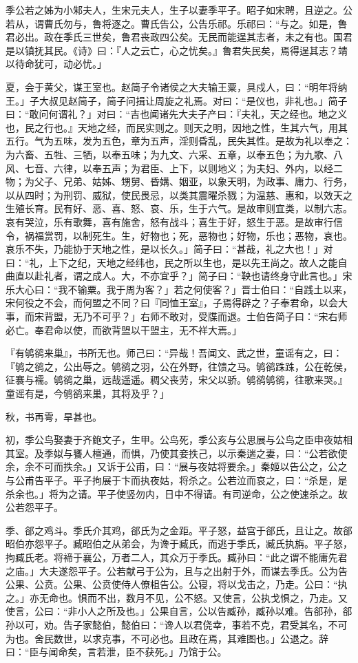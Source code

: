\documentclass[]{article}
\begin{document}
季公若之姊为小邾夫人，生宋元夫人，生子以妻季平子。昭子如宋聘，且逆之。公若从，谓曹氏勿与，鲁将逐之。曹氏告公，公告乐祁。乐祁曰：``与之。如是，鲁君必出。政在季氏三世矣，鲁君丧政四公矣。无民而能逞其志者，未之有也。国君是以镇抚其民。《诗》曰：『人之云亡，心之忧矣。』鲁君失民矣，焉得逞其志？靖以待命犹可，动必忧。」

夏，会于黄父，谋王室也。赵简子令诸侯之大夫输王粟，具戍人，曰：``明年将纳王。」子大叔见赵简子，简子问揖让周旋之礼焉。对曰：``是仪也，非礼也。」简子曰：``敢问何谓礼？」对曰：``吉也闻诸先大夫子产曰：『夫礼，天之经也。地之义也，民之行也。』天地之经，而民实则之。则天之明，因地之性，生其六气，用其五行。气为五味，发为五色，章为五声，淫则昏乱，民失其性。是故为礼以奉之：为六畜、五牲、三牺，以奉五味；为九文、六采、五章，以奉五色；为九歌、八风、七音、六律，以奉五声；为君臣、上下，以则地义；为夫妇、外内，以经二物；为父子、兄弟、姑姊、甥舅、昏媾、姻亚，以象天明，为政事、庸力、行务，以从四时；为刑罚、威狱，使民畏忌，以类其震曜杀戮；为温慈、惠和，以效天之生殖长育。民有好、恶、喜、怒、哀、乐，生于六气。是故审则宜类，以制六志。哀有哭泣，乐有歌舞，喜有施舍，怒有战斗；喜生于好，怒生于恶。是故审行信令，祸福赏罚，以制死生。生，好物也；死，恶物也；好物，乐也；恶物，哀也。哀乐不失，乃能协于天地之性，是以长久。」简子曰：``甚哉，礼之大也！」对曰：``礼，上下之纪，天地之经纬也，民之所以生也，是以先王尚之。故人之能自曲直以赴礼者，谓之成人。大，不亦宜乎？」简子曰：``鞅也请终身守此言也。」宋乐大心曰：``我不输粟。我于周为客？」若之何使客？」晋士伯曰：``自践土以来，宋何役之不会，而何盟之不同？曰『同恤王室』，子焉得辟之？子奉君命，以会大事，而宋背盟，无乃不可乎？」右师不敢对，受牒而退。士伯告简子曰：``宋右师必亡。奉君命以使，而欲背盟以干盟主，无不祥大焉。」

『有鸲鹆来巢』，书所无也。师己曰：``异哉！吾闻文、武之世，童谣有之，曰：『鸲之鹆之，公出辱之。鸲鹆之羽，公在外野，往馈之马。鸲鹆跦跦，公在乾侯，征褰与襦。鸲鹆之巢，远哉遥遥。稠父丧劳，宋父以骄。鸲鹆鸲鹆，往歌来哭。』童谣有是，今鸲鹆来巢，其将及乎？」

秋，书再雩，旱甚也。

初，季公鸟娶妻于齐鲍文子，生甲。公鸟死，季公亥与公思展与公鸟之臣申夜姑相其室。及季姒与饔人檀通，而惧，乃使其妾抶己，以示秦遄之妻，曰：``公若欲使余，余不可而抶余。」又诉于公甫，曰：``展与夜姑将要余。」秦姬以告公之，公之与公甫告平子。平子拘展于卞而执夜姑，将杀之。公若泣而哀之，曰：``杀是，是杀余也。」将为之请。平子使竖勿内，日中不得请。有司逆命，公之使速杀之。故公若怨平子。

季、郤之鸡斗。季氏介其鸡，郤氏为之金距。平子怒，益宫于郤氏，且让之。故郤昭伯亦怨平子。臧昭伯之从弟会，为谗于臧氏，而逃于季氏，臧氏执旃。平子怒，拘臧氏老。将褅于襄公，万者二人，其众万于季氏。臧孙曰：``此之谓不能庸先君之庙。」大夫遂怨平子。公若献弓于公为，且与之出射于外，而谋去季氏。公为告公果、公贲。公果、公贲使侍人僚柤告公。公寝，将以戈击之，乃走。公曰：``执之。」亦无命也。惧而不出，数月不见，公不怒。又使言，公执戈惧之，乃走。又使言，公曰：``非小人之所及也。」公果自言，公以告臧孙，臧孙以难。告郤孙，郤孙以可，劝。告子家懿伯，懿伯曰：``谗人以君侥幸，事若不克，君受其名，不可为也。舍民数世，以求克事，不可必也。且政在焉，其难图也。」公退之。辞曰：``臣与闻命矣，言若泄，臣不获死。」乃馆于公。
\end{document}
